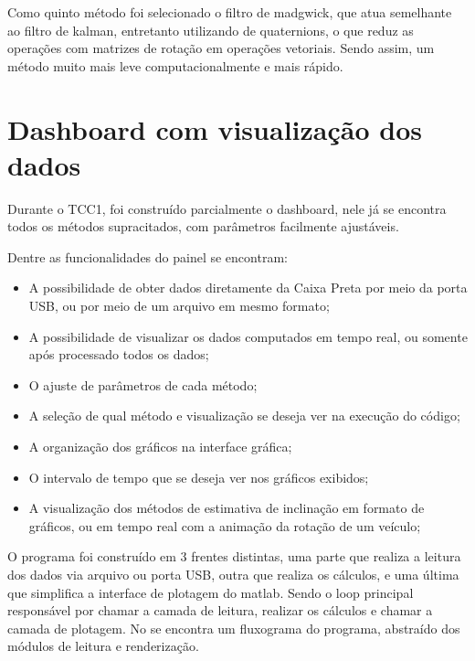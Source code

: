 Como quinto método foi selecionado o filtro de madgwick, que atua semelhante ao filtro de kalman, entretanto utilizando de quaternions, o que reduz as operações com matrizes de rotação em operações vetoriais. Sendo assim, um método muito mais leve computacionalmente e mais rápido. \cite{sanket_madgwick_nodate}

\section{Dashboard com visualização dos dados}

Durante o TCC1, foi construído parcialmente o dashboard, nele já se encontra todos os métodos supracitados, com parâmetros facilmente ajustáveis.

Dentre as funcionalidades do painel se encontram:
\begin{itemize}
  \item A possibilidade de obter dados diretamente da Caixa Preta por meio da porta USB, ou por meio de um arquivo em mesmo formato;
  \item A possibilidade de visualizar os dados computados em tempo real, ou somente após processado todos os dados;
  \item O ajuste de parâmetros de cada método;
  \item A seleção de qual método e visualização se deseja ver na execução do código;
  \item A organização dos gráficos na interface gráfica;
  \item O intervalo de tempo que se deseja ver nos gráficos exibidos;
  \item A visualização dos métodos de estimativa de inclinação em formato de gráficos, ou em tempo real com a animação da rotação de um veículo;
\end{itemize}

%

O programa foi construído em 3 frentes distintas, uma parte que realiza a leitura dos dados via arquivo ou porta USB, outra que realiza os cálculos, e uma última que simplifica a interface de plotagem do matlab. Sendo o loop principal responsável por chamar a camada de leitura, realizar os cálculos e chamar a camada de plotagem. No  se encontra um fluxograma do programa, abstraído dos módulos de leitura e renderização.
